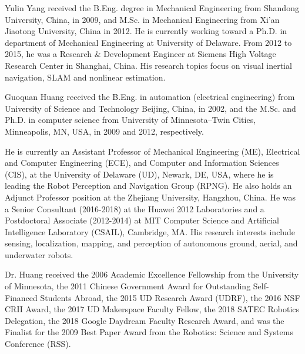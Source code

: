 
\begin{IEEEbiography}{Yulin Yang}
received the B.Eng. degree in Mechanical Engineering from Shandong University, China, in 2009, and M.Sc. in Mechanical Engineering from Xi'an Jiaotong University, China in 2012. 
He is currently working toward a Ph.D. in department of Mechanical Engineering at University of Delaware. From 2012 to 2015, he was a Research \& Development Engineer at Siemens High Voltage Research Center in Shanghai, China. 
His research topics focus on visual inertial navigation, SLAM and nonlinear estimation. 
\end{IEEEbiography}




\begin{IEEEbiography}{Guoquan Huang}
received the B.Eng. in automation (electrical engineering) from University of Science and Technology Beijing,  China,  in  2002,  and  the  M.Sc.  and  Ph.D. in computer science from University of Minnesota--Twin Cities, Minneapolis, MN, USA, in 2009 and 2012, respectively. 


He  is  currently an Assistant Professor of Mechanical Engineering (ME), Electrical and Computer Engineering (ECE), and Computer and Information Sciences (CIS), at the University of Delaware (UD), Newark, DE, USA, where he is leading the Robot Perception and Navigation Group (RPNG). He also holds an Adjunct Professor position at the Zhejiang University, Hangzhou, China. He was a Senior Consultant (2016-2018) at the Huawei 2012 Laboratories and a Postdoctoral Associate (2012-2014) at MIT Computer Science and Artificial Intelligence Laboratory (CSAIL), Cambridge, MA. 
His research interests  include sensing, localization, mapping, and perception of autonomous ground, aerial, and underwater robots. 


Dr. Huang received the 2006 Academic Excellence Fellowship from the University of Minnesota, the 2011 Chinese Government Award for Outstanding Self-Financed Students Abroad, the 2015 UD Research Award (UDRF), the 2016 NSF CRII Award, the 2017 UD Makerspace Faculty Fellow, the 2018 SATEC Robotics Delegation, the  2018 Google Daydream Faculty Research Award, and was the Finalist for the 2009 Best Paper Award from the Robotics: Science and Systems Conference (RSS).

\end{IEEEbiography}



